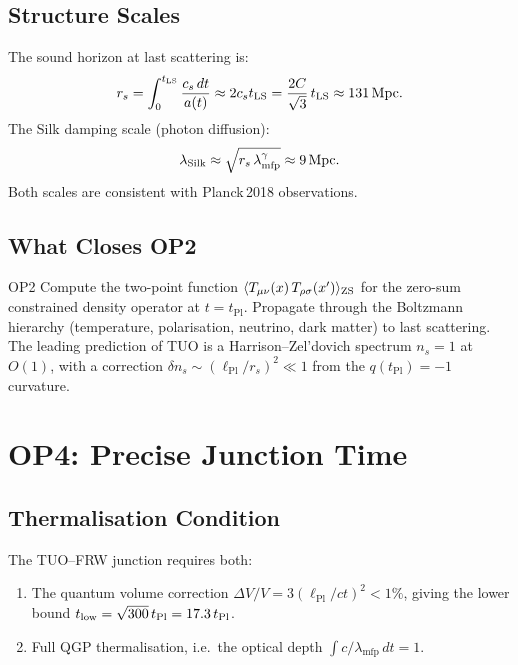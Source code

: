 \documentclass[12pt,a4paper]{article}
\theoremstyle{definition}
\newcommand{\tPl}{t_{\mathrm{Pl}}}
\newcommand{\lPl}{\ell_{\mathrm{Pl}}}
\newcommand{\Hmfp}{\lambda_{\mathrm{mfp}}}
\begin{document}
\subsection{Structure Scales}

The sound horizon at last scattering is:
\begin{equation}
  r_s = \int_0^{t_{\rm LS}} \frac{c_s\,dt}{a(t)} \approx 2c_s t_{\rm LS}
  = \frac{2C}{\sqrt{3}}\,t_{\rm LS} \approx 131\,\mathrm{Mpc}.
\end{equation}
The Silk damping scale (photon diffusion):
\begin{equation}
  \lambda_{\rm Silk} \approx \sqrt{r_s\,\lambda_{\rm mfp}^\gamma}
  \approx 9\,\mathrm{Mpc}.
\end{equation}
Both scales are consistent with Planck\,2018 observations.

\subsection{What Closes OP2}

\begin{openprobbox}{OP2}
Compute the two-point function
$\langle T_{\mu\nu}(x)\,T_{\rho\sigma}(x')\rangle_{\rm ZS}$
for the zero-sum constrained density operator at $t = \tPl$.
Propagate through the Boltzmann hierarchy (temperature, polarisation,
neutrino, dark matter) to last scattering.
The leading prediction of TUO is a Harrison--Zel'dovich spectrum $n_s = 1$
at $O(1)$, with a correction $\delta n_s \sim (\lPl/r_s)^2 \ll 1$
from the $q(\tPl) = -1$ curvature.
\end{openprobbox}

\section{OP4: Precise Junction Time}
\label{sec:op4}

\subsection{Thermalisation Condition}

The TUO--FRW junction requires both:
\begin{enumerate}
\item The quantum volume correction $\Delta V/V = 3(\lPl/ct)^2 < 1\%$,
  giving the lower bound $t_{\rm low} = \sqrt{300}\,\tPl = 17.3\,\tPl$.
\item Full QGP thermalisation, i.e.\ the optical depth $\int c/\Hmfp\,dt = 1$.
\end{enumerate}
\end{document}
